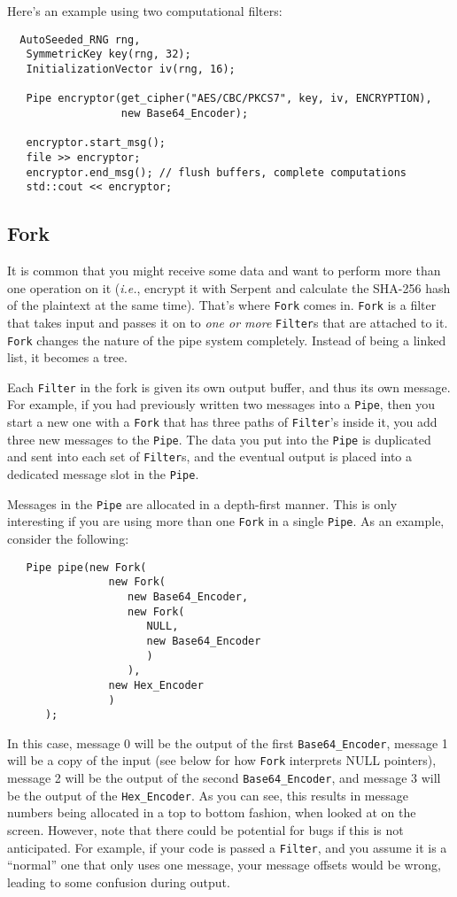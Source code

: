 \documentclass{article}
\newcommand{\type}[1]{\texttt{#1}}
\newcommand{\ie}[0]{\emph{i.e.}}
\begin{document}
Here's an example using two computational filters:

\begin{verbatim}
  AutoSeeded_RNG rng,
   SymmetricKey key(rng, 32);
   InitializationVector iv(rng, 16);

   Pipe encryptor(get_cipher("AES/CBC/PKCS7", key, iv, ENCRYPTION),
                  new Base64_Encoder);

   encryptor.start_msg();
   file >> encryptor;
   encryptor.end_msg(); // flush buffers, complete computations
   std::cout << encryptor;
\end{verbatim}

\subsection{Fork}

It is common that you might receive some data and want to
perform more than one operation on it (\ie, encrypt it with Serpent
and calculate the SHA-256 hash of the plaintext at the same
time). That's where \type{Fork} comes in. \type{Fork} is a filter that
takes input and passes it on to \emph{one or more} \type{Filter}s
that are attached to it. \type{Fork} changes the nature of the pipe
system completely. Instead of being a linked list, it becomes a tree.

Each \type{Filter} in the fork is given its own output buffer, and
thus its own message. For example, if you had previously written two
messages into a \type{Pipe}, then you start a new one with a
\type{Fork} that has three paths of \type{Filter}'s inside it, you
add three new messages to the \type{Pipe}. The data you put into the
\type{Pipe} is duplicated and sent into each set of \type{Filter}s,
and the eventual output is placed into a dedicated message slot in the
\type{Pipe}.

Messages in the \type{Pipe} are allocated in a depth-first manner. This is only
interesting if you are using more than one \type{Fork} in a single \type{Pipe}.
As an example, consider the following:

\begin{verbatim}
   Pipe pipe(new Fork(
                new Fork(
                   new Base64_Encoder,
                   new Fork(
                      NULL,
                      new Base64_Encoder
                      )
                   ),
                new Hex_Encoder
                )
      );
\end{verbatim}

In this case, message 0 will be the output of the first \type{Base64\_Encoder},
message 1 will be a copy of the input (see below for how \type{Fork} interprets
NULL pointers), message 2 will be the output of the second
\type{Base64\_Encoder}, and message 3 will be the output of the
\type{Hex\_Encoder}. As you can see, this results in message numbers being
allocated in a top to bottom fashion, when looked at on the screen. However,
note that there could be potential for bugs if this is not anticipated. For
example, if your code is passed a \type{Filter}, and you assume it is a
``normal'' one that only uses one message, your message offsets would be
wrong, leading to some confusion during output.
\end{document}
